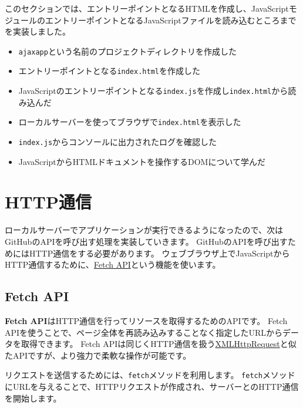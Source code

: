 このセクションでは、エントリーポイントとなるHTMLを作成し、JavaScriptモジュールのエントリーポイントとなるJavaScriptファイルを読み込むところまでを実装しました。

\begin{itemize}
\item
  \texttt{ajaxapp}という名前のプロジェクトディレクトリを作成した
\item
  エントリーポイントとなる\texttt{index.html}を作成した
\item
  JavaScriptのエントリーポイントとなる\texttt{index.js}を作成し\texttt{index.html}から読み込んだ
\item
  ローカルサーバーを使ってブラウザで\texttt{index.html}を表示した
\item
  \texttt{index.js}からコンソールに出力されたログを確認した
\item
  JavaScriptからHTMLドキュメントを操作するDOMについて学んだ
\end{itemize}

\hypertarget{http-communication}{%
\section{HTTP通信}\label{http-communication}}

ローカルサーバーでアプリケーションが実行できるようになったので、次はGitHubのAPIを呼び出す処理を実装していきます。
GitHubのAPIを呼び出すためにはHTTP通信をする必要があります。
ウェブブラウザ上でJavaScriptからHTTP通信するために、\href{https://developer.mozilla.org/ja/docs/Web/API/Fetch_API}{Fetch
API}という機能を使います。

\hypertarget{fetch-api}{%
\subsection{Fetch API}\label{fetch-api}}

\textbf{Fetch API}はHTTP通信を行ってリソースを取得するためのAPIです。
Fetch
APIを使うことで、ページ全体を再読み込みすることなく指定したURLからデータを取得できます。
Fetch
APIは同じくHTTP通信を扱う\href{https://developer.mozilla.org/ja/docs/Web/API/XMLHttpRequest}{XMLHttpRequest}と似たAPIですが、より強力で柔軟な操作が可能です。

リクエストを送信するためには、\texttt{fetch}メソッドを利用します。
\texttt{fetch}メソッドにURLを与えることで、HTTPリクエストが作成され、サーバーとのHTTP通信を開始します。

